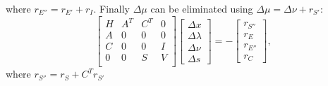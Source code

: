 \documentclass{article}
\begin{document}
where $r_{E''} = r_{E'} + r_I$. Finally $\Delta \mu$ can be eliminated  using $\Delta \mu = \Delta \nu + r_{S'}$:
\begin{equation}
\begin{bmatrix}
H 	& A^T 	& C^T 	&	 0 	\\
A 	& 0 	& 0 	& 0		\\
C 	& 0 	& 0 	& I	\\
0 	& 0 	& S 	& V		\\
\end{bmatrix}
\begin{bmatrix}
\Delta x \\ \Delta \lambda \\\Delta \nu \\ \Delta s
\end{bmatrix}
=
-\begin{bmatrix}
r_{S''}  \\ r_E \\ r_{E''} \\ r_C
\end{bmatrix},
\end{equation}
where $r_{S''} = r_S + C^Tr_{S'}$

 
\end{document}
